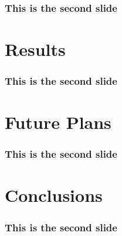 \documentclass{beamer}
\begin{document}
  \begin{frame}
    \frametitle{This is the second slide}
  \end{frame}

\section{Results}  

  \begin{frame}
    \frametitle{This is the second slide}
  \end{frame}

\section{Future Plans}

  \begin{frame}
    \frametitle{This is the second slide}
  \end{frame}

\section{Conclusions}

  \begin{frame}
    \frametitle{This is the second slide}
  \end{frame}
\end{document}
